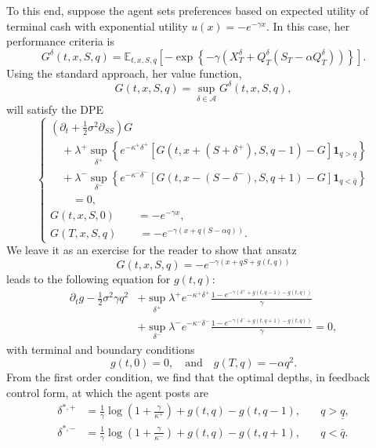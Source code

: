 \documentclass[11pt, a4paper]{book}
\newcommand{\E}{\mathbb{E}}
\newcommand{\Ind}{\mathbf{1}}
\begin{document}
	To this end, suppose the agent sets preferences based on expected utility of terminal cash with exponential utility $u(x) = -e^{-\gamma x}$. In this case, her performance criteria is
	\[
	G^\delta (t, x, S, q) = \E_{t,x,S,q} \left[ -\exp \left\{ -\gamma \left( X^\delta_T + Q^\delta_T (S_T - \alpha Q^\delta_T) \right) \right\} \right].
	\]
	Using the standard approach, her value function,
	\[
	G(t, x, S, q) = \sup_{\delta \in \mathcal{A}} G^\delta(t, x, S, q),
	\]
	will satisfy the DPE
	\[
	\begin{cases}
		\left( \partial_t + \tfrac{1}{2}\sigma^2 \partial_{SS} \right) G \\
		\quad + \lambda^+ \sup_{\delta^+} \left\{ e^{-\kappa^+ \delta^+} \left[ G(t, x + (S + \delta^+), S, q - 1) - G \right] \Ind_{q > \underline{q}} \right\} \\
		\quad + \lambda^- \sup_{\delta^-} \left\{ e^{-\kappa^- \delta^-} \left[ G(t, x - (S - \delta^-), S, q + 1) - G \right] \Ind_{q < \bar{q}} \right\} \\
		\qquad = 0, \\
		G(t, x, S, 0) \qquad = -e^{-\gamma x}, \\
		G(T, x, S, q) \qquad = -e^{-\gamma (x + q(S - \alpha q))}.
	\end{cases}
	\]
	We leave it as an exercise for the reader to show that ansatz
	\[
	G(t, x, S, q) = -e^{-\gamma (x + q S + g(t, q))}
	\]
	leads to the following equation for $g(t, q)$:
	\begin{equation}
		\begin{aligned}
			\partial_t g - \tfrac{1}{2}\sigma^2 \gamma q^2 &+ \sup_{\delta^+} \lambda^+ e^{-\kappa^+ \delta^+} \frac{1 - e^{-\gamma (\delta^+ + g(t, q-1) - g(t, q))}}{\gamma} \\
			&+ \sup_{\delta^-} \lambda^- e^{-\kappa^- \delta^-} \frac{1 - e^{-\gamma (\delta^- + g(t, q+1) - g(t, q))}}{\gamma} = 0,
		\end{aligned} \label{eq:10.18}
	\end{equation}
	with terminal and boundary conditions
	\[
	g(t, 0) = 0, \quad \text{and} \quad g(T, q) = -\alpha q^2.
	\]
	From the first order condition, we find that the optimal depths, in feedback control form, at which the agent posts are
	\begin{equation}
		\boxed{
			\begin{aligned}
				\delta^{*, +} &= \frac{1}{\gamma} \log \left( 1 + \frac{\gamma}{\kappa^+} \right) + g(t, q) - g(t, q-1), \quad & q > \underline{q}, \\
				\delta^{*, -} &= \frac{1}{\gamma} \log \left( 1 + \frac{\gamma}{\kappa^-} \right) + g(t, q) - g(t, q+1), \quad & q < \bar{q}.
			\end{aligned}
		} \label{eq:10.19}
	\end{equation}
	
\end{document}
